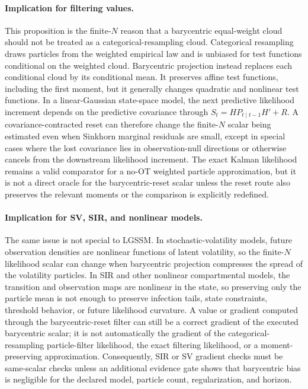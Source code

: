 \paragraph{Implication for filtering values.}
This proposition is the finite-\(N\) reason that a barycentric equal-weight cloud
should not be treated as a categorical-resampling cloud.  Categorical resampling
draws particles from the weighted empirical law and is unbiased for test
functions conditional on the weighted cloud.  Barycentric projection instead
replaces each conditional cloud by its conditional mean.  It preserves affine
test functions, including the first moment, but it generally changes quadratic
and nonlinear test functions.  In a linear-Gaussian state-space model, the next
predictive likelihood increment depends on the predictive covariance through
\(S_t=H P_{t\mid t-1}H'+R\).  A covariance-contracted reset can therefore change
the finite-\(N\) scalar being estimated even when Sinkhorn marginal residuals are
small, except in special cases where the lost covariance lies in observation-null
directions or otherwise cancels from the downstream likelihood increment.  The
exact Kalman likelihood remains a valid comparator for a no-OT weighted particle
approximation, but it is not a direct oracle for the barycentric-reset scalar
unless the reset route also preserves the relevant moments or the comparison is
explicitly redefined.

\paragraph{Implication for SV, SIR, and nonlinear models.}
The same issue is not special to LGSSM.  In stochastic-volatility models, future
observation densities are nonlinear functions of latent volatility, so the
finite-\(N\) likelihood scalar can change when barycentric projection compresses
the spread of the volatility particles.  In SIR and other nonlinear compartmental
models, the transition and observation maps are nonlinear in the state, so
preserving only the particle mean is not enough to preserve infection tails,
state constraints, threshold behavior, or future likelihood curvature.  A value
or gradient computed through the barycentric-reset filter can still be a correct
gradient of the executed barycentric scalar; it is not automatically the gradient
of the categorical-resampling particle-filter likelihood, the exact filtering
likelihood, or a moment-preserving approximation.  Consequently, SIR or SV
gradient checks must be same-scalar checks unless an additional evidence gate
shows that barycentric bias is negligible for the declared model, particle count,
regularization, and horizon.

